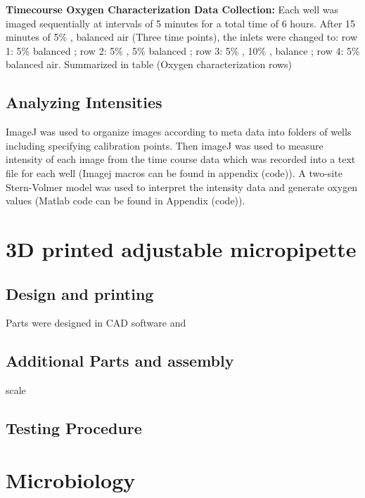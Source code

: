 \textbf{Timecourse Oxygen Characterization Data Collection:} 
Each well was imaged sequentially at intervals of 5 minutes for a total time of 6 hours.
After 15 minutes of 5\% , balanced air (Three time points), the inlets were changed to: row 1: 5\%  balanced ; row 2: 5\% , 5\%  balanced ; row 3: 5\% , 10\% , balance ; row 4: 5\%  balanced air.
Summarized in table (Oxygen characterization rows)

\subsection{Analyzing Intensities}
ImageJ was used to organize images according to meta data into folders of wells including specifying calibration points.
Then imageJ was used to measure intensity of each image from the time course data which was recorded into a text file for each well (Imagej macros can be found in appendix (code)).
A two-site Stern-Volmer model was used to interpret the intensity data and generate oxygen values (Matlab code can be found in Appendix (code)).


\section{3D printed adjustable micropipette}

\subsection{Design and printing}

Parts were designed in CAD software and  

\subsection{Additional Parts and assembly}

scale 

\subsection{Testing Procedure}
    


\section{Microbiology}

